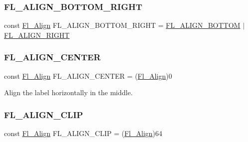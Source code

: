 \subsubsection{\texorpdfstring{F\+L\+\_\+\+A\+L\+I\+G\+N\+\_\+\+B\+O\+T\+T\+O\+M\+\_\+\+R\+I\+G\+HT}{FL\_ALIGN\_BOTTOM\_RIGHT}}
{\footnotesize\ttfamily const \hyperlink{_enumerations_8_h_a44e8bcd1e030e65e4f88cbae64a7c3e3}{Fl\+\_\+\+Align} F\+L\+\_\+\+A\+L\+I\+G\+N\+\_\+\+B\+O\+T\+T\+O\+M\+\_\+\+R\+I\+G\+HT = \hyperlink{_enumerations_8_h_a1ea3fa817f07b80dced581f58de842ae}{F\+L\+\_\+\+A\+L\+I\+G\+N\+\_\+\+B\+O\+T\+T\+OM} $\vert$ \hyperlink{_enumerations_8_h_a16646615fa4863fae6f7975b36c3987e}{F\+L\+\_\+\+A\+L\+I\+G\+N\+\_\+\+R\+I\+G\+HT}}

\mbox{\label{_enumerations_8_h_a427f1ce53c37478a59f64bec4a2e2241}} 
\subsubsection{\texorpdfstring{F\+L\+\_\+\+A\+L\+I\+G\+N\+\_\+\+C\+E\+N\+T\+ER}{FL\_ALIGN\_CENTER}}
{\footnotesize\ttfamily const \hyperlink{_enumerations_8_h_a44e8bcd1e030e65e4f88cbae64a7c3e3}{Fl\+\_\+\+Align} F\+L\+\_\+\+A\+L\+I\+G\+N\+\_\+\+C\+E\+N\+T\+ER = (\hyperlink{_enumerations_8_h_a44e8bcd1e030e65e4f88cbae64a7c3e3}{Fl\+\_\+\+Align})0}

Align the label horizontally in the middle. \mbox{\label{_enumerations_8_h_a527e2db976be1a8508c226b4ca54eaa7}} 
\subsubsection{\texorpdfstring{F\+L\+\_\+\+A\+L\+I\+G\+N\+\_\+\+C\+L\+IP}{FL\_ALIGN\_CLIP}}
{\footnotesize\ttfamily const \hyperlink{_enumerations_8_h_a44e8bcd1e030e65e4f88cbae64a7c3e3}{Fl\+\_\+\+Align} F\+L\+\_\+\+A\+L\+I\+G\+N\+\_\+\+C\+L\+IP = (\hyperlink{_enumerations_8_h_a44e8bcd1e030e65e4f88cbae64a7c3e3}{Fl\+\_\+\+Align})64}

